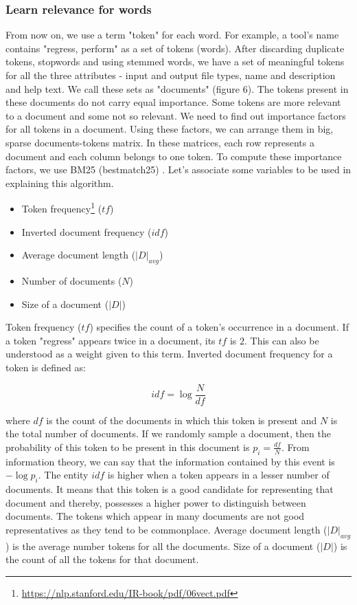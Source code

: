 \subsubsection{Learn relevance for words}
From now on, we use a term "token" for each word. For example, a tool's name contains "regress, perform" as a set of tokens (words). After discarding duplicate tokens, stopwords and using stemmed words, we have a set of meaningful tokens for all the three attributes - input and output file types, name and description and help text. We call these sets as "documents" (figure 6). The tokens present in these documents do not carry equal importance. Some tokens are more relevant to a document and some not so relevant. We need to find out importance factors for all tokens in a document. Using these factors, we can arrange them in big, sparse documents-tokens matrix. In these matrices, each row represents a document and each column belongs to one token. To compute these importance factors, we use BM25 (bestmatch25) \cite{Robertson:2009:PRF:1704809.1704810}. Let's associate some variables to be used in explaining this algorithm.

\begin{itemize}
	\item Token frequency\footnote{\url{https://nlp.stanford.edu/IR-book/pdf/06vect.pdf}} ($tf$)
	\item Inverted document frequency ($idf$)
	\item Average document length ($|D|_{avg}$)
	\item Number of documents ($N$)
	\item Size of a document ($|D|$)
\end{itemize}
    
Token frequency ($tf$) specifies the count of a token's occurrence in a document. If a token "regress" appears twice in a document, its $tf$ is $2$. This can also be understood as a weight given to this term. Inverted document frequency for a token is defined as:

\begin{equation}
idf = \log \frac{N}{df}
\end{equation}
 
where $df$ is the count of the documents in which this token is present and $N$ is the total number of documents. If we randomly sample a document, then the probability of this token to be present in this document is $ p_i = \frac{df}{N} $. From information theory, we can say that the information contained by this event is $ - \log p_i $. The entity $idf$ is higher when a token appears in a lesser number of documents. It means that this token is a good candidate for representing that document and thereby, possesses a higher power to distinguish between documents. The tokens which appear in many documents are not good representatives as they tend to be commonplace. Average document length ($|D|_{avg}$) is the average number tokens for all the documents. Size of a document ($|D|$) is the count of all the tokens for that document. 

